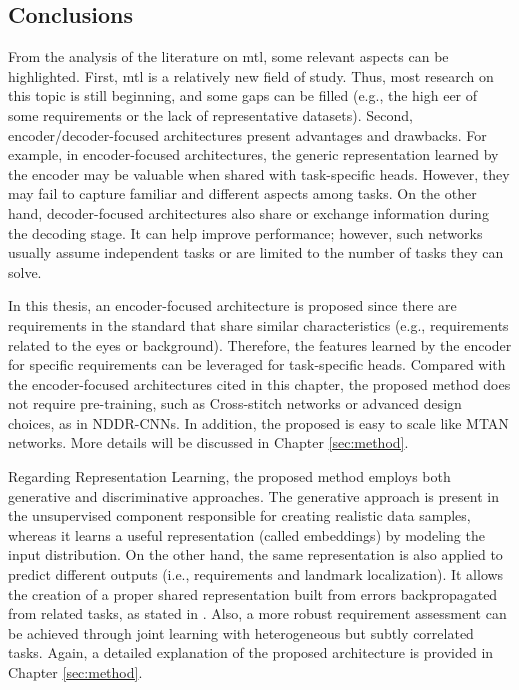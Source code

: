 \subsection{Conclusions}
 
From the analysis of the literature on \acl{mtl}, some relevant aspects can be highlighted. First, \acs{mtl} is a relatively new field of study. Thus, most research on this topic is still beginning, and some gaps can be filled (e.g., the high \acs{eer} of some requirements or the lack of representative datasets). Second, encoder/decoder-focused architectures present advantages and drawbacks. For example, in encoder-focused architectures, the generic representation learned by the encoder may be valuable when shared with task-specific heads. However, they may fail to capture familiar and different aspects among tasks. On the other hand, decoder-focused architectures also share or exchange information during the decoding stage. It can help improve performance; however, such networks usually assume independent tasks or are limited to the number of tasks they can solve. 
 
In this thesis, an encoder-focused architecture is proposed since there are requirements in the \icao standard that share similar characteristics (e.g., requirements related to the eyes or background). Therefore, the features learned by the encoder for specific requirements can be leveraged for task-specific heads. Compared with the encoder-focused architectures cited in this chapter, the proposed method does not require pre-training, such as Cross-stitch networks or advanced design choices, as in NDDR-CNNs. In addition, the proposed \methodname is easy to scale like MTAN networks. More details will be discussed in Chapter \ref{sec:method}.
 
Regarding Representation Learning, the proposed method employs both generative and discriminative approaches. The generative approach is present in the unsupervised component responsible for creating realistic data samples, whereas it learns a useful representation (called embeddings) by modeling the input distribution. On the other hand, the same representation is also applied to predict different outputs (i.e., requirements and landmark localization). It allows the creation of a proper shared representation built from errors backpropagated from related tasks, as stated in \citep{zhang2014facial}. Also, a more robust requirement assessment can be achieved through joint learning with heterogeneous but subtly correlated tasks. Again, a detailed explanation of the proposed architecture is provided in Chapter \ref{sec:method}.
 
